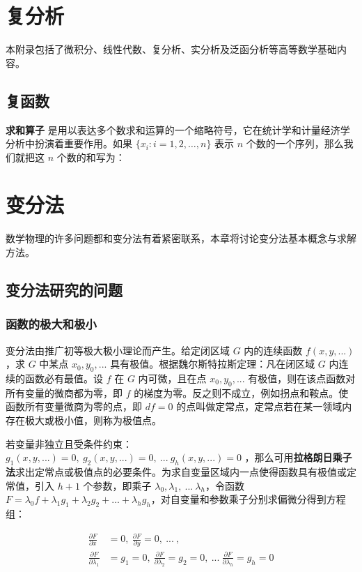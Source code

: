 \documentclass[cn,11pt,chinese,blue,bibstyle=ieeetr]{elegantbook}
\begin{document}
{\chapter{复分析}


本附录包括了微积分、线性代数、复分析、实分析及泛函分析等高等数学基础内容。

\section{复函数}

\textbf{求和算子} 是用以表达多个数求和运算的一个缩略符号，它在统计学和计量经济学分析中扮演着重要作用。如果 $\{x_i: i=1, 2, \ldots, n\}$ 表示 $n$ 个数的一个序列，那么我们就把这 $n$ 个数的和写为：


\chapter{变分法}
数学物理的许多问题都和变分法有着紧密联系，本章将讨论变分法基本概念与求解方法。


\section{变分法研究的问题}


\subsection{函数的极大和极小}

变分法由推广初等极大极小理论而产生。给定闭区域 $G$ 内的连续函数 $f(x,y,...)$ ，求 $G$ 中某点 $x_0, y_0, ...$ 具有极值。根据魏尔斯特拉斯定理：凡在闭区域 $G$ 内连续的函数必有最值。设 $f$ 在 $G$ 内可微，且在点 $x_0, y_0, ...$ 有极值，则在该点函数对所有变量的微商都为零，即 $f$ 的梯度为零。反之则不成立，例如拐点和鞍点。使函数所有变量微商为零的点，即 $df = 0$ 的点叫做定常点，定常点若在某一领域内存在极大或极小值，则称为极值点。

若变量非独立且受条件约束： ${g_1}(x,y,...) = 0, \ {g_2}(x,y,...) = 0, \ ... \ {g_h}(x,y,...) = 0$ ，那么可用\textbf{拉格朗日乘子法}求出定常点或极值点的必要条件。为求自变量区域内一点使得函数具有极值或定常值，引入 $h + 1$ 个参数，即乘子 $\lambda_0, \lambda_1, \ ... \ \lambda_h$，令函数 $F = {\lambda_0}f + {\lambda_1}{g_1} + {\lambda_2}{g_2} + ... + {\lambda_h}{g_h}$，对自变量和参数乘子分别求偏微分得到方程组：

\begin{equation}\label{lagelangrichengzifa}
\begin{aligned}
\frac{\partial F}{\partial x} &= 0, \ \frac{\partial F}{\partial y} = 0, \ ... \ , \\
\frac{\partial F}{\partial {\lambda_1}} &= {g_1} = 0, \ \frac{\partial F}{\partial  {\lambda_2}} = {g_2} = 0, \ ... \ \frac{\partial F}{\partial  {\lambda_h}} = {g_h} = 0
\end{aligned}
\end{equation}

}
\end{document}
